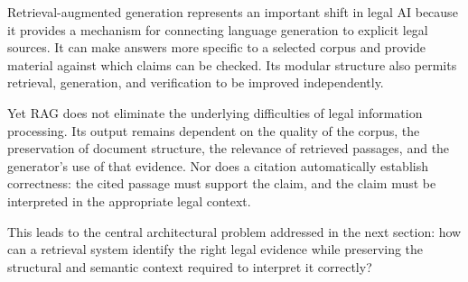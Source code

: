 Retrieval-augmented generation represents an important shift in legal AI because it provides a
mechanism for connecting language generation to explicit legal sources. It can make answers more
specific to a selected corpus and provide material against which claims can be checked. Its modular
structure also permits retrieval, generation, and verification to be improved independently.

Yet RAG does not eliminate the underlying difficulties of legal information processing. Its output
remains dependent on the quality of the corpus, the preservation of document structure, the relevance
of retrieved passages, and the generator's use of that evidence. Nor does a citation automatically
establish correctness: the cited passage must support the claim, and the claim must be interpreted in
the appropriate legal context.

This leads to the central architectural problem addressed in the next section: how can a retrieval
system identify the right legal evidence while preserving the structural and semantic context
required to interpret it correctly?

